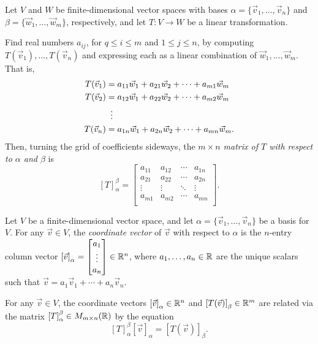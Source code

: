\begin{definition}
	Let $V$ and $W$ be finite-dimensional vector spaces with bases $\alpha =
	\{\vec{v}_1, \dots, \vec{v}_n\}$ and $\beta = \{\vec{w}_1, \dots,
	\vec{w}_m\}$, respectively, and let $T : V \rightarrow W$ be a linear
	transformation.

	Find real numbers $a_{ij}$, for $q \leq i \leq m$ and $1 \leq j \leq n$, by
	computing $T(\vec{v}_1), \dots, T(\vec{v}_n)$ and expressing each as a linear
	combination of $\vec{w}_1, \dots, \vec{w}_m$. That is,
	\begin{align*}
		T(\vec{v}_1) &= a_{11} \vec{w}_1 + a_{21} \vec{w}_2 + \cdots + a_{m1}
		\vec{w}_m \\
		T(\vec{v}_2) &= a_{12} \vec{w}_1 + a_{22} \vec{w}_2 + \cdots + a_{m2}
		\vec{w}_m \\
		&\vdotswithin{=} \\
		T(\vec{v}_n) &= a_{1n} \vec{w}_1 + a_{2n} \vec{w}_2 + \cdots + a_{mn}
		\vec{w}_m.
	\end{align*}
	Then, turning the grid of coefficients sideways, the \emph{$m \times n$ matrix
	of $T$ with respect to $\alpha$ and $\beta$} is
	\[
		{[T]}_\alpha^\beta =
		\begin{bmatrix}
			a_{11} & a_{12} & \cdots & a_{1n} \\
			a_{21} & a_{22} & \cdots & a_{2n} \\
			\vdots & \vdots & \ddots & \vdots \\
			a_{m1} & a_{m2} & \cdots & a_{mn} \\
		\end{bmatrix}.
	\]
\end{definition}

\begin{definition}
	Let $V$ be a finite-dimensional vector space, and let $\alpha = \{\vec{v}_1,
	\dots, \vec{v}_n\}$ be a basis for $V$. For any $\vec{v} \in V$, the
	\emph{coordinate vector} of $\vec{v}$ with respect to $\alpha$ is the
	$n$-entry column vector ${[\vec{v}]}_\alpha =
	\begin{bmatrix}
		a_1 \\
		\vdots \\
		a_n
	\end{bmatrix} \in {\mathbb{R}}^n$,
	where $a_1, \dots, a_n \in {\mathbb{R}}$ are the unique scalars such that $\vec{v} = a_1
	\vec{v}_1 + \cdots + a_n \vec{v}_n$.
\end{definition}

\begin{fact}
	For any $\vec{v} \in V$, the coordinate vectors ${[\vec{v}]}_\alpha \in {\mathbb{R}}^n$
	and ${[T(\vec{v})]}_\beta \in {\mathbb{R}}^m$ are related via the matrix
	${[T]}_\alpha^\beta \in M_{m \times n}({\mathbb{R}})$ by the equation
	\[
		{[T]}_\alpha^\beta {[\vec{v}]}_\alpha = {[T(\vec{v})]}_\beta.
	\]
\end{fact}

